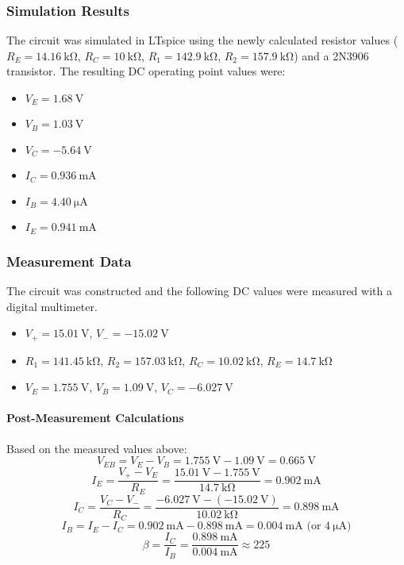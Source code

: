 \documentclass[12pt]{article}
\begin{document}
\subsubsection{Simulation Results}
The circuit was simulated in LTspice using the newly calculated resistor values ($R_E=\SI{14.16}{\kilo\ohm}$, $R_C=\SI{10}{\kilo\ohm}$, $R_1=\SI{142.9}{\kilo\ohm}$, $R_2=\SI{157.9}{\kilo\ohm}$) and a 2N3906 transistor. The resulting DC operating point values were:
\begin{itemize}
    \item $V_E = \SI{1.68}{\volt}$
    \item $V_B = \SI{1.03}{\volt}$
    \item $V_C = \SI{-5.64}{\volt}$
    \item $I_C = \SI{0.936}{\milli\ampere}$
    \item $I_B = \SI{4.40}{\micro\ampere}$
    \item $I_E = \SI{0.941}{\milli\ampere}$
\end{itemize}

\subsubsection{Measurement Data}
The circuit was constructed and the following DC values were measured with a digital multimeter.
\begin{itemize}
    \item $V_+ = \SI{15.01}{\volt}$, $V_- = \SI{-15.02}{\volt}$
    \item $R_1 = \SI{141.45}{\kilo\ohm}$, $R_2 = \SI{157.03}{\kilo\ohm}$, $R_C = \SI{10.02}{\kilo\ohm}$, $R_E = \SI{14.7}{\kilo\ohm}$ %
    \item $V_E = \SI{1.755}{\volt}$, $V_B = \SI{1.09}{\volt}$, $V_C = \SI{-6.027}{\volt}$
\end{itemize}

\paragraph{Post-Measurement Calculations}
Based on the measured values above:
$$
V_{EB} = V_E - V_B = \SI{1.755}{\volt} - \SI{1.09}{\volt} = \SI{0.665}{\volt}
$$
$$
I_E = \frac{V_{+} - V_E}{R_E} = \frac{\SI{15.01}{\volt} - \SI{1.755}{\volt}}{\SI{14.7}{\kilo\ohm}} = \SI{0.902}{\milli\ampere}
$$
$$
I_C = \frac{V_C - V_{-}}{R_C} = \frac{\SI{-6.027}{\volt} - (\SI{-15.02}{\volt})}{\SI{10.02}{\kilo\ohm}} = \SI{0.898}{\milli\ampere}
$$
$$
I_B = I_E - I_C = \SI{0.902}{\milli\ampere} - \SI{0.898}{\milli\ampere} = \SI{0.004}{\milli\ampere} \text{ (or } \SI{4}{\micro\ampere})
$$
$$
\beta = \frac{I_C}{I_B} = \frac{\SI{0.898}{\milli\ampere}}{\SI{0.004}{\milli\ampere}} \approx 225
$$
\end{document}
